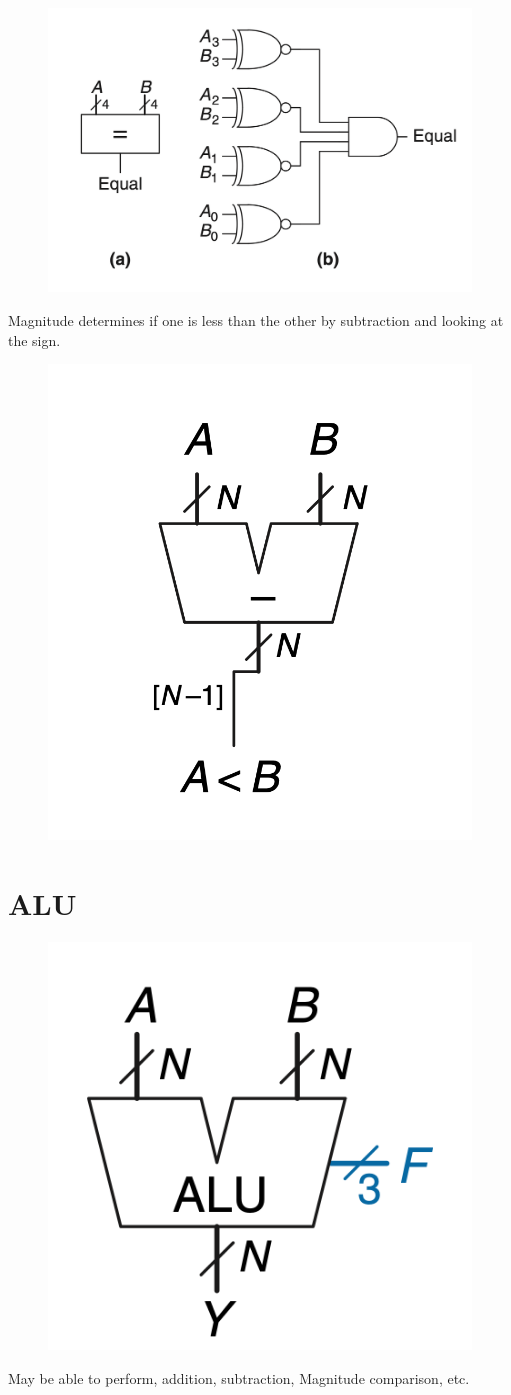 \documentclass[12pt]{report}
\begin{document}
\begin{figure}[h!]
  \centering
  \includegraphics[width=.4\textwidth]{equality-comparator-implementation.png}
\end{figure}

Magnitude determines if one is less than the other by subtraction and looking at the sign. 

\begin{figure}[h!]
  \centering
  \includegraphics[width=.4\textwidth]{Magnitude-comparator.png}
\end{figure}

\pagebreak

\section{ALU}
\begin{figure}[H]
  \centering
  \includegraphics[width=.25\textwidth]{ALU.png}
\end{figure}

May be able to perform, addition, subtraction, Magnitude comparison, etc. 
\end{document}
